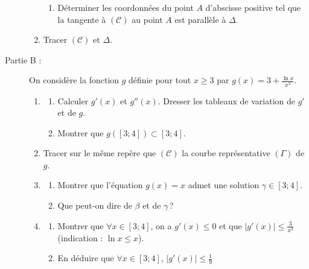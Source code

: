 \begin{exo}
\begin{description}
\begin{enumerate}
\begin{enumerate}
                                    \item D\'eterminer les coordonn\'ees du point $A$ d'abscisse positive
                                           tel que la tangente \`a $(\mathscr{C})$ au point $A$ est parall\`ele \`a $\Delta$.
                              \end{enumerate}
                        \item Tracer $(\mathscr{C})$ et $\Delta$.
                  \end{enumerate}
            \item[Partie B :]
                  On consid\`ere la fonction $g$ d\'efinie pour tout $x \geq 3$ par 
                  $g(x) = \displaystyle{ 3 + \frac{\ln x}{x^3} }$.
                  \begin{enumerate}
                        \item \begin{enumerate}
                                    \item Calculer $g'(x)$ et $g''(x)$.
                                          Dresser les tableaux de variation de $g'$ et de $g$.
                                    \item Montrer que $g\left( [ 3 ; 4 ] \right) \subset [ 3 ; 4 ]$.
                              \end{enumerate}
                        \item Tracer sur le m\^eme rep\`ere que $(\mathscr{C})$ la courbe 
                              repr\'esentative $(\Gamma)$ de $g$.
                        \item \begin{enumerate}
                                    \item Montrer que l'\'equation $g(x) = x$ admet une solution $\gamma \in [ 3 ; 4 ]$.
                                    \item Que peut-on dire de $\beta$ et de $\gamma$\,?
                              \end{enumerate}
                        \item \begin{enumerate}
                                    \item Montrer que $\forall x \in [ 3 ; 4 ]$, on a $g'(x) \leq 0$
                                          et que $|g'(x)| \leq \frac{3}{x^3}$ (indication : $\ln x \leq x$).
                                    \item En d\'eduire que $\forall x \in [ 3 ; 4 ]$, $|g'(x)| \leq \frac{1}{9}$

\end{enumerate}
\end{enumerate}
\end{description}
\end{exo}
